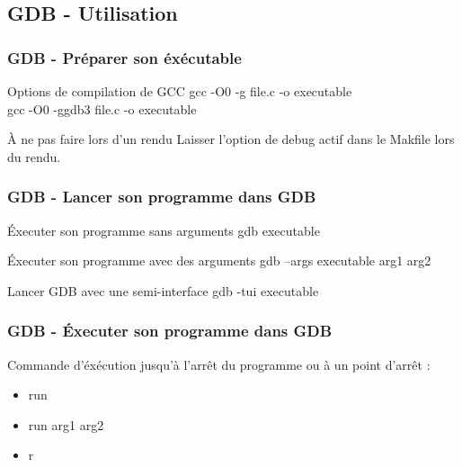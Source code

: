\documentclass[8pt]{beamer}
\begin{document}


\subsection{GDB - Utilisation} %
\label{sub:gdb_utilisation}

\begin{frame}
\frametitle{GDB - Préparer son éxécutable}

\begin{block}{Options de compilation de GCC}
	gcc -O0 -g file.c -o executable\\
	gcc -O0 -ggdb3 file.c -o executable
\end{block}

\begin{alertblock}{À ne pas faire lors d'un rendu}
Laisser l'option de debug actif dans le Makfile lors du rendu.
\end{alertblock}

\end{frame}


\begin{frame}
\frametitle{GDB - Lancer son programme dans GDB}
\begin{block}{Éxecuter son programme sans arguments}
	gdb executable
\end{block}

\begin{block}{Éxecuter son programme avec des arguments}
	gdb --args executable arg1 arg2
\end{block}

\begin{block}{Lancer GDB avec une semi-interface}
	gdb -tui executable
\end{block}

\end{frame}


\begin{frame}
\frametitle{GDB - Éxecuter son programme dans GDB}

Commande d'éxécution jusqu'à l'arrêt du programme ou à un point d'arrêt :
\begin{itemize}
	\item run
	\onslide<3->\item run arg1 arg2
	\onslide<4->\item r
\end{itemize}

\end{frame}
\end{document}
